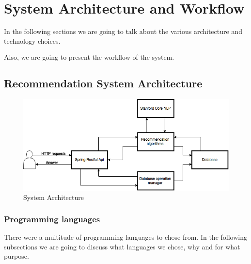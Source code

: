\chapter{System Architecture and Workflow}
\label{chapter:system-architecture}

In the following sections we are going to talk about the various architecture and technology choices.

Also, we are going to present the workflow of the system.

\section{Recommendation System Architecture} 
\label{sec:architecture}

\begin{figure}[h]
\caption{System Architecture}
\includegraphics[width=1.0\textwidth]{src/img/architecture.png}
\end{figure}

\subsection{Programming languages}
\label{sec:programming-languages}
There were a multitude of programming languages to chose from.
In the following subsections we are going to discuss what languages we chose, why and for what purpose.

